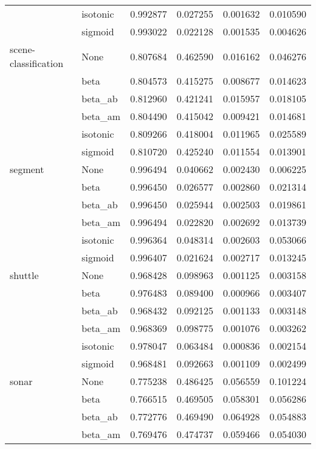\begin{tabular}{llrrrr}
        & isotonic &  0.992877 &  0.027255 &  0.001632 &  0.010590 \\
        & sigmoid &  0.993022 &  0.022128 &  0.001535 &  0.004626 \\
scene-classification & None &  0.807684 &  0.462590 &  0.016162 &  0.046276 \\
        & beta &  0.804573 &  0.415275 &  0.008677 &  0.014623 \\
        & beta\_ab &  0.812960 &  0.421241 &  0.015957 &  0.018105 \\
        & beta\_am &  0.804490 &  0.415042 &  0.009421 &  0.014681 \\
        & isotonic &  0.809266 &  0.418004 &  0.011965 &  0.025589 \\
        & sigmoid &  0.810720 &  0.425240 &  0.011554 &  0.013901 \\
segment & None &  0.996494 &  0.040662 &  0.002430 &  0.006225 \\
        & beta &  0.996450 &  0.026577 &  0.002860 &  0.021314 \\
        & beta\_ab &  0.996450 &  0.025944 &  0.002503 &  0.019861 \\
        & beta\_am &  0.996494 &  0.022820 &  0.002692 &  0.013739 \\
        & isotonic &  0.996364 &  0.048314 &  0.002603 &  0.053066 \\
        & sigmoid &  0.996407 &  0.021624 &  0.002717 &  0.013245 \\
shuttle & None &  0.968428 &  0.098963 &  0.001125 &  0.003158 \\
        & beta &  0.976483 &  0.089400 &  0.000966 &  0.003407 \\
        & beta\_ab &  0.968432 &  0.092125 &  0.001133 &  0.003148 \\
        & beta\_am &  0.968369 &  0.098775 &  0.001076 &  0.003262 \\
        & isotonic &  0.978047 &  0.063484 &  0.000836 &  0.002154 \\
        & sigmoid &  0.968481 &  0.092663 &  0.001109 &  0.002499 \\
sonar & None &  0.775238 &  0.486425 &  0.056559 &  0.101224 \\
        & beta &  0.766515 &  0.469505 &  0.058301 &  0.056286 \\
        & beta\_ab &  0.772776 &  0.469490 &  0.064928 &  0.054883 \\
        & beta\_am &  0.769476 &  0.474737 &  0.059466 &  0.054030 \\

\end{tabular}
